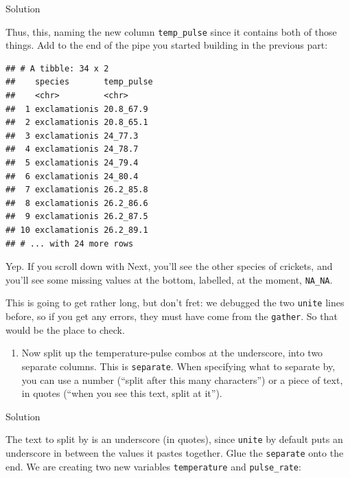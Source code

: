 \documentclass[]{tufte-book}
\newenvironment{Shaded}{}{}
\newcommand{\KeywordTok}[1]{\textcolor[rgb]{0.00,0.44,0.13}{\textbf{#1}}}
\newcommand{\NormalTok}[1]{#1}
\newcommand{\OperatorTok}[1]{\textcolor[rgb]{0.40,0.40,0.40}{#1}}
\newcommand{\StringTok}[1]{\textcolor[rgb]{0.25,0.44,0.63}{#1}}
\providecommand{\tightlist}{%
  \setlength{\itemsep}{0pt}\setlength{\parskip}{0pt}}
\theoremstyle{definition}
\theoremstyle{definition}
\theoremstyle{definition}
\theoremstyle{remark}
\begin{document}
Solution

Thus, this, naming the new column \texttt{temp\_pulse} since it contains
both of those things. Add to the end of the pipe you started building in
the previous part:

\begin{Shaded}
\end{Shaded}

\begin{verbatim}
## # A tibble: 34 x 2
##    species       temp_pulse
##    <chr>         <chr>     
##  1 exclamationis 20.8_67.9 
##  2 exclamationis 20.8_65.1 
##  3 exclamationis 24_77.3   
##  4 exclamationis 24_78.7   
##  5 exclamationis 24_79.4   
##  6 exclamationis 24_80.4   
##  7 exclamationis 26.2_85.8 
##  8 exclamationis 26.2_86.6 
##  9 exclamationis 26.2_87.5 
## 10 exclamationis 26.2_89.1 
## # ... with 24 more rows
\end{verbatim}

Yep. If you scroll down with Next, you'll see the other species of
crickets, and you'll see some missing values at the bottom, labelled, at
the moment, \texttt{NA\_NA}.

This is going to get rather long, but don't fret: we debugged the two
\texttt{unite} lines before, so if you get any errors, they must have
come from the \texttt{gather}. So that would be the place to check.

\begin{enumerate}
\def\labelenumi{(\alph{enumi})}
\setcounter{enumi}{3}
\tightlist
\item
  Now split up the temperature-pulse combos at the underscore, into two
  separate columns. This is \texttt{separate}. When specifying what to
  separate by, you can use a number (``split after this many
  characters'') or a piece of text, in quotes (``when you see this text,
  split at it'').
\end{enumerate}

Solution

The text to split by is an underscore (in quotes), since \texttt{unite}
by default puts an underscore in between the values it pastes together.
Glue the \texttt{separate} onto the end. We are creating two new
variables \texttt{temperature} and \texttt{pulse\_rate}:
\end{document}

